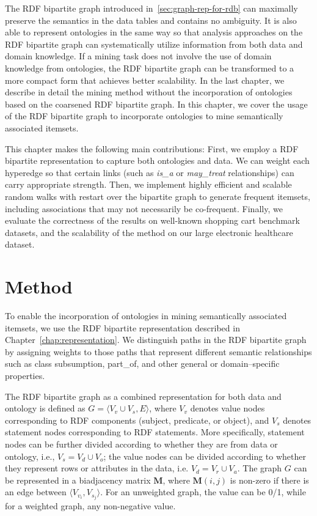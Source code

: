 The RDF bipartite graph introduced in~\ref{sec:graph-rep-for-rdb} can maximally preserve the semantics in the data tables and contains no ambiguity. It is also able to represent ontologies in the same way so that analysis approaches on the RDF bipartite graph can systematically utilize information from both data and domain knowledge. If a mining task does not involve the use of domain knowledge from ontologies, the RDF bipartite graph can be transformed to a more compact form that achieves better scalability. In the last chapter, we describe in detail the mining method without the incorporation of ontologies based on the coarsened RDF bipartite graph. In this chapter, we cover the usage of the RDF bipartite graph to incorporate ontologies to mine semantically associated itemsets.

This chapter makes the following main contributions:  First, we employ a RDF bipartite representation to capture both ontologies and data. We can weight each hyperedge so that certain links (such as \emph{is\_a} or \emph{may\_treat} relationships) can carry appropriate strength.  Then, we implement highly efficient and scalable random walks with restart over the bipartite graph to generate frequent itemsets, including associations that may not necessarily be co-frequent. Finally, we evaluate the correctness of the results on well-known shopping cart benchmark datasets, and the scalability of the method on our large electronic healthcare dataset.
\section{Method}

To enable the incorporation of ontologies in mining semantically associated itemsets, we use the RDF bipartite representation described in Chapter~\ref{chap:representation}. We distinguish paths in the RDF bipartite graph by assigning weights to those paths that represent different semantic relationships such as class subsumption, part\_of, and other general or domain--specific properties.

The RDF bipartite graph as a combined representation for both data and ontology is defined as $G=\langle V_v \cup V_s, E \rangle$, where $V_v$ denotes value nodes corresponding to RDF components (subject, predicate, or object), and $V_s$ denotes statement nodes corresponding to RDF statements. More specifically, statement nodes can be further divided according to whether they are from data or ontology, i.e., $V_s=V_d \cup V_o$; the value nodes can be divided according to whether they represent rows or attributes in the data, i.e. $V_d=V_r \cup V_a$. The graph $G$ can be represented in a biadjacency matrix $\mathbf{M}$, where $\mathbf{M}(i,j)$ is non-zero if there is an edge between $\langle V_{v_i}, V_{s_j} \rangle$. For an unweighted graph, the value can be 0/1, while for a weighted graph, any non-negative value.

